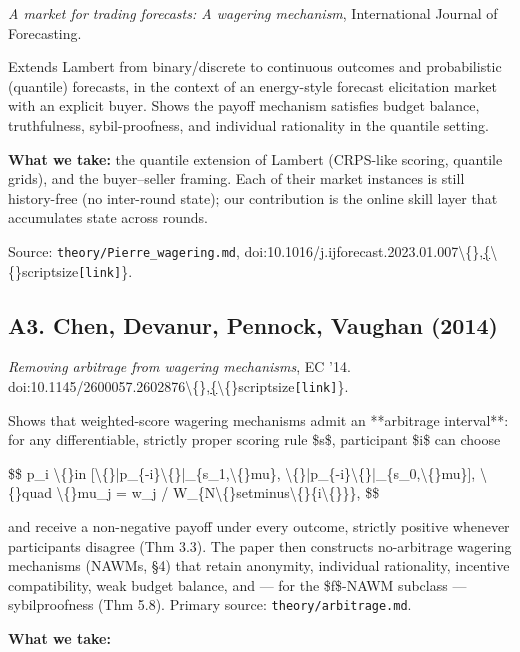 \documentclass[11pt,a4paper,openany]{report}
\begin{document}
\emph{A market for trading forecasts: A wagering mechanism}, International
Journal of Forecasting.

Extends Lambert from binary/discrete to continuous outcomes and
probabilistic (quantile) forecasts, in the context of an energy-style
forecast elicitation market with an explicit buyer. Shows the payoff
mechanism satisfies budget balance, truthfulness, sybil-proofness, and
individual rationality in the quantile setting.

\textbf{What we take:} the quantile extension of Lambert (CRPS-like scoring,
quantile grids), and the buyer–seller framing. Each of their market
instances is still history-free (no inter-round state); our contribution
is the online skill layer that accumulates state across rounds.

Source: \texttt{theory/Pierre\_wagering.md},
doi:10.1016/j.ijforecast.2023.01.007\textbackslash\{\},\href{https://doi.org/10.1016/j.ijforecast.2023.01.007}\{\textbackslash\{\}scriptsize\texttt{[link]}\}.

\subsection{A3. Chen, Devanur, Pennock, Vaughan (2014)}

\emph{Removing arbitrage from wagering mechanisms}, EC '14.
doi:10.1145/2600057.2602876\textbackslash\{\},\href{https://doi.org/10.1145/2600057.2602876}\{\textbackslash\{\}scriptsize\texttt{[link]}\}.

Shows that weighted-score wagering mechanisms admit an **arbitrage
interval**: for any differentiable, strictly proper scoring rule \$s\$,
participant \$i\$ can choose

\$\$
p\_i \textbackslash\{\}in [\textbackslash\{\}|p\_\{-i\}\textbackslash\{\}|\_\{s\_1,\textbackslash\{\}mu\}, \textbackslash\{\}|p\_\{-i\}\textbackslash\{\}|\_\{s\_0,\textbackslash\{\}mu\}], \textbackslash\{\}quad
\textbackslash\{\}mu\_j = w\_j / W\_\{N\textbackslash\{\}setminus\textbackslash\{\}\{i\textbackslash\{\}\}\},
\$\$

and receive a non-negative payoff under every outcome, strictly
positive whenever participants disagree (Thm 3.3). The paper then
constructs no-arbitrage wagering mechanisms (NAWMs, §4) that retain
anonymity, individual rationality, incentive compatibility, weak
budget balance, and — for the \$f\$-NAWM subclass — sybilproofness
(Thm 5.8). Primary source: \texttt{theory/arbitrage.md}.

\textbf{What we take:}
\end{document}
